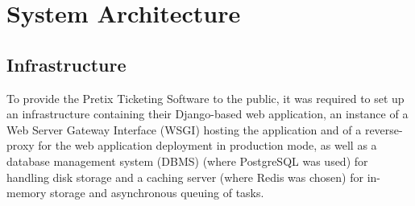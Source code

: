 \documentclass[12pt]{article}
\begin{document}



\newpage
\section{System Architecture} \label{architecture} %

\subsection{Infrastructure} \label{architecture.infrastructure} %


To provide the Pretix Ticketing Software to the public, it was required to set up an infrastructure containing their Django-based web application, an instance
of a Web Server Gateway Interface (WSGI) hosting the application and of a reverse-proxy for the web application deployment in production mode, as well as a
database management system (DBMS) (where PostgreSQL was used) for handling disk storage and a caching server (where Redis was chosen) for in-memory storage and
asynchronous queuing of tasks.
\end{document}
